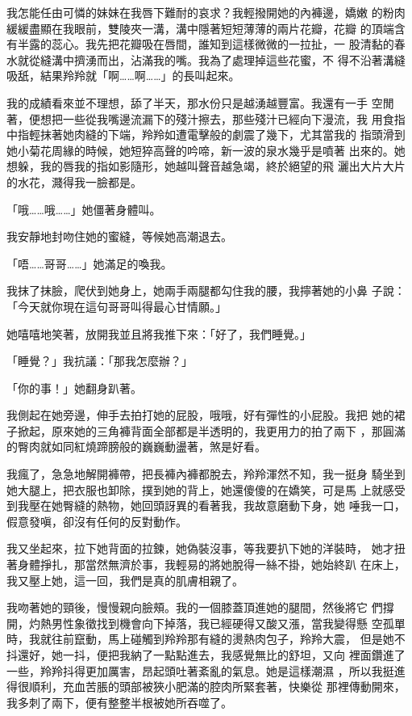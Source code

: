 我怎能任由可憐的妹妹在我唇下難耐的哀求？我輕撥開她的內褲邊，嬌嫩
的粉肉緩緩盡顯在我眼前，雙陵夾一溝，溝中隱著短短薄薄的兩片花瓣，花瓣
的頂端含有半露的蕊心。我先把花瓣吸在唇間，誰知到這樣微微的一拉扯，一
股清黏的春水就從縫溝中擠湧而出，沾滿我的嘴。我為了處理掉這些花蜜，不
得不沿著溝縫吸舐，結果羚羚就「啊……啊……」的長叫起來。

我的成績看來並不理想，舔了半天，那水份只是越湧越豐富。我還有一手
空閒著，便想把一些從我嘴邊流漏下的殘汁擦去，那些殘汁已經向下漫流，我
用食指中指輕抹著她肉縫的下端，羚羚如遭電擊般的劇震了幾下，尤其當我的
指頭滑到她小菊花周緣的時候，她短猝高聲的吟啼，新一波的泉水幾乎是噴著
出來的。她想躲，我的唇我的指如影隨形，她越叫聲音越急竭，終於絕望的飛
灑出大片大片的水花，濺得我一臉都是。

「哦……哦……」她僵著身體叫。

我安靜地封吻住她的蜜縫，等候她高潮退去。

「唔……哥哥……」她滿足的喚我。

我抹了抹臉，爬伏到她身上，她兩手兩腿都勾住我的腰，我擰著她的小鼻
子說：「今天就你現在這句哥哥叫得最心甘情願。」

她嘻嘻地笑著，放開我並且將我推下來：「好了，我們睡覺。」

「睡覺？」我抗議：「那我怎麼辦？」

「你的事！」她翻身趴著。

我側起在她旁邊，伸手去拍打她的屁股，哦哦，好有彈性的小屁股。我把
她的裙子掀起，原來她的三角褲背面全部都是半透明的，我更用力的拍了兩下
，那圓滿的臀肉就如同紅燒蹄膀般的巍巍動盪著，煞是好看。

我瘋了，急急地解開褲帶，把長褲內褲都脫去，羚羚渾然不知，我一挺身
騎坐到她大腿上，把衣服也卸除，撲到她的背上，她還傻傻的在嬌笑，可是馬
上就感受到我壓在她臀縫的熱物，她回頭訝異的看著我，我故意磨動下身，她
唾我一口，假意發嗔，卻沒有任何的反對動作。

我又坐起來，拉下她背面的拉鍊，她偽裝沒事，等我要扒下她的洋裝時，
她才扭著身體掙扎，那當然無濟於事，我輕易的將她脫得一絲不掛，她始終趴
在床上，我又壓上她，這一回，我們是真的肌膚相親了。

我吻著她的頸後，慢慢親向臉頰。我的一個膝蓋頂進她的腿間，然後將它
們撐開，灼熱男性象徵找到機會向下掉落，我已經硬得又酸又漲，當我變得懸
空孤單時，我就往前竄動，馬上碰觸到羚羚那有縫的燙熱肉包子，羚羚大震，
但是她不抖還好，她一抖，便把我納了一點點進去，我感覺無比的舒坦，又向
裡面鑽進了一些，羚羚抖得更加厲害，昂起頭吐著紊亂的氣息。她是這樣潮濕
，所以我挺進得很順利，充血苦脹的頭部被狹小肥滿的腔肉所緊套著，快樂從
那裡傳動開來，我多刺了兩下，便有整整半根被她所吞噬了。

